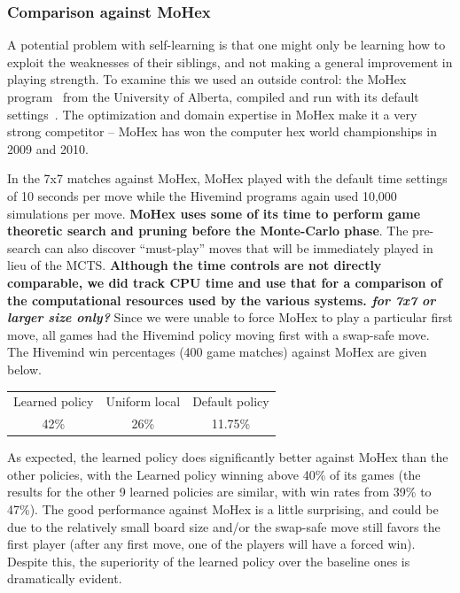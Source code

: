 \documentclass{acm_proc_article-sp}
\begin{document}
\subsubsection*{Comparison against MoHex}

A potential problem with self-learning is that one might only be learning how to exploit the weaknesses of their siblings, and
not making a general improvement in playing strength.  
To examine this we used an outside control:  the MoHex program~\cite{mohex} from the University of Alberta, compiled and run with its default settings~\cite{mohex}. 
The optimization and domain expertise in MoHex make it a very strong  competitor --  MoHex has won the computer hex world championships in 2009 and 2010.

In the 7x7 matches against MoHex, 
MoHex played with the default time settings of 10 seconds per move while the Hivemind programs again used
10,000 simulations per move.
\textbf{MoHex uses some of its time to perform game theoretic search and pruning before the Monte-Carlo phase}. 
The pre-search can also discover ``must-play'' moves that will be immediately played in lieu of the MCTS. 
\textbf{Although the time controls are not directly comparable, we did track CPU time and use that for a comparison of 
the computational resources used by the various systems.  \emph{for 7x7 or larger size only?}}
Since we were unable to force MoHex to play a particular first move, all games had the Hivemind policy moving first with a swap-safe move.  The Hivemind win percentages (400 game matches) against MoHex are given below.

\begin{centering}
\begin{tabular}{ccc}
Learned policy & Uniform local & Default policy \\
42\% & 26\% & 11.75\%
\end{tabular}
\end{centering}

As expected, the learned policy does significantly better against MoHex than the other policies,
with the Learned policy winning above 40\% of its games (the results for the other 9 learned policies are similar,
with win rates from 39\% to 47\%).   
The good performance against MoHex is a little surprising, and could be due to the relatively small board size and/or 
the swap-safe move still favors the first player (after any first move, one of the players will have a forced win).
Despite this, the superiority of the learned policy over the baseline ones is dramatically evident.
\end{document}
